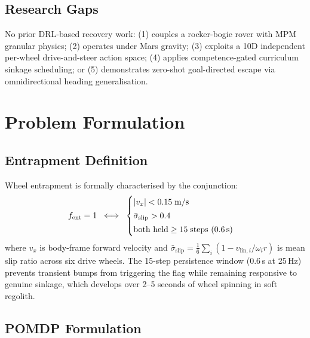 \documentclass[conference]{IEEEtran}
\begin{document}
\subsection{Research Gaps}

No prior DRL-based recovery work: (1) couples a rocker-bogie rover with MPM
granular physics; (2) operates under Mars gravity; (3) exploits a 10D
independent per-wheel drive-and-steer action space; (4) applies
competence-gated curriculum sinkage scheduling; or (5) demonstrates zero-shot
goal-directed escape via omnidirectional heading generalisation.

\section{Problem Formulation}
\label{sec:problem}

\subsection{Entrapment Definition}

Wheel entrapment is formally characterised by the conjunction:
\begin{equation}
  f_{\text{ent}} = 1 \;\iff\;
  \begin{cases}
    |v_x| < 0.15\;\text{m/s}\\[2pt]
    \bar{\sigma}_{\text{slip}} > 0.4 \\[2pt]
    \text{both held} \geq 15\;\text{steps (0.6\,s)}
  \end{cases}
  \label{eq:entrapment}
\end{equation}
where $v_x$ is body-frame forward velocity and
$\bar{\sigma}_{\text{slip}} = \tfrac{1}{6}\sum_i(1 - v_{\text{lin},i}/\omega_i r)$
is mean slip ratio across six drive wheels. The 15-step persistence window (0.6\,s at 25\,Hz) prevents transient bumps from
triggering the flag while remaining responsive to genuine sinkage, which develops
over 2--5 seconds of wheel spinning in soft regolith.

\subsection{POMDP Formulation}
\end{document}
